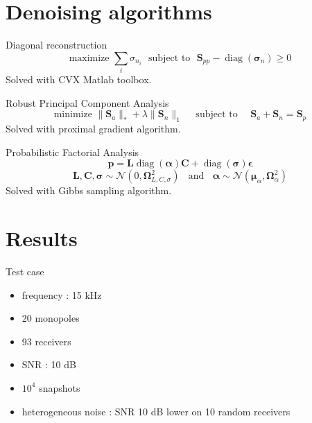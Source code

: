 \documentclass[10pt,xcolor=x11names,compress, notes=show]{beamer}%
\begin{document}
\section{Denoising algorithms}
\begin{frame}{\insertsectionhead}
	\begin{block}{Diagonal reconstruction}
		\begin{equation*}
		    \text{maximize~} \sum_i \sigma_{n_i} \text{~~subject to~~} \bm{S}_{pp}-\operatorname{diag}(\bm{\sigma}_n)\geq 0
		\end{equation*}
		Solved with CVX Matlab toolbox.
	\end{block}	
	\begin{block}{Robust Principal Component Analysis}
		\begin{equation*}
			\text{minimize~} \|\bm{{S}}_{a} \|_* + \lambda \| \bm{{S}}_{n} \|_1  \text{~~~~subject to~~~~}  \bm{{S}}_{a} +  \bm{{S}}_{n} = \bm{S}_{p}
		\end{equation*}
		Solved with proximal gradient algorithm.
	\end{block}	
	\begin{block}{Probabilistic Factorial Analysis}
		\begin{equation*}
		        \bm{p} = \bm{L}\operatorname{diag}(\bm{\alpha})\bm{C} +\operatorname{diag}(\bm{\sigma})\bm{\epsilon}
		\end{equation*}
		\begin{equation*}
		   \bm{L},\bm{C},\bm{\sigma}\sim \mathcal{N}(0,\bm{\Omega}_{L,C,\sigma}^2)~~~~\text{and}~~~~\bm{\alpha}\sim \mathcal{N}(\bm{\mu}_{\alpha},\bm{\Omega}_{\alpha}^2)
		\end{equation*}
		Solved with Gibbs sampling algorithm.
	\end{block}
\end{frame}

\section{Results}
\begin{frame}{Test case}
	\begin{multicols}{2}
		\begin{itemize}
			\item frequency : 15 kHz
			\item 20 monopoles
			\item 93 receivers
			\item SNR : 10 dB
			\item $10^4$ snapshots
		\end{itemize}	
	\end{multicols}	\vspace{-16pt}
	\begin{itemize}
    		\item heterogeneous noise : SNR 10 dB lower on 10 random receivers
	\end{itemize}
	\vfill
	\centering
	
\end{frame}
\end{document}
